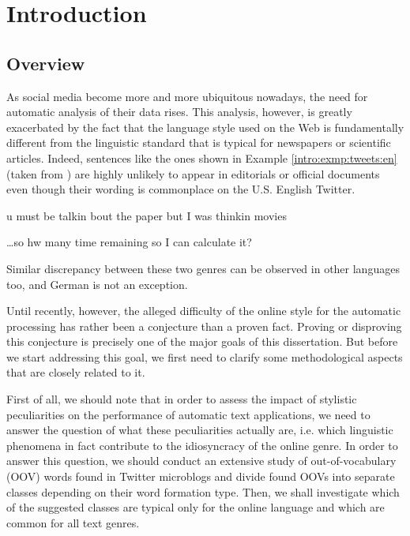 

\chapter{Introduction}

\section{Overview}
As social media become more and more ubiquitous nowadays, the need for
automatic analysis of their data rises.  This analysis, however, is greatly
exacerbated by the fact that the language style used on the Web is
fundamentally different from the linguistic standard that is typical for
newspapers or scientific articles.  Indeed, sentences like the ones shown in
Example \ref{intro:exmp:tweets:en} (taken from \citet{HanBaldwin:11}) are
highly unlikely to appear in editorials or official documents even though
their wording is commonplace on the U.S. English Twitter.
\begin{example}\label{intro:exmp:tweets:en}
u must be talkin bout the paper but I was thinkin movies

\dots so hw many time remaining so I can calculate it?
\end{example}
Similar discrepancy between these two genres can be observed in other
languages too, and German is not an exception.

Until recently, however, the alleged difficulty of the online style for the
automatic processing has rather been a conjecture than a proven fact.  Proving
or disproving this conjecture is precisely one of the major goals of this
dissertation.  But before we start addressing this goal, we first need to
clarify some methodological aspects that are closely related to it.

First of all, we should note that in order to assess the impact of stylistic
peculiarities on the performance of automatic text applications, we need to
answer the question of what these peculiarities actually are, i.e. which
linguistic phenomena in fact contribute to the idiosyncracy of the online
genre.  In order to answer this question, we should conduct an extensive study
of out-of-vocabulary (OOV) words found in Twitter microblogs and divide found
OOVs into separate classes depending on their word formation type.  Then, we
shall investigate which of the suggested classes are typical only for the
online language and which are common for all text genres.

